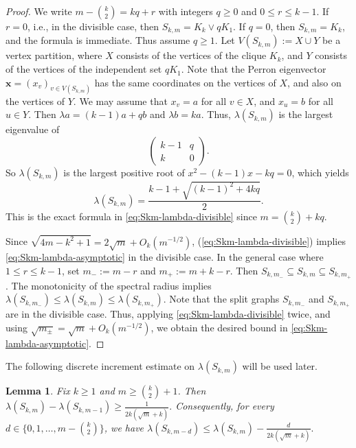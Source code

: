 \documentclass[10pt,a4paper]{amsart}
\newtheorem{lemma}[theorem]{Lemma}
\begin{document}
\begin{proof}
We write $m-\binom{k}{2}=kq+r$ with integers \(q\ge0\) and \(0\le r\le k-1\).
If $r=0$, i.e., in the divisible case, then $S_{k,m}=K_k\vee qK_1$.
If \(q=0\), then \(S_{k,m}=K_k\), and the formula is immediate. Thus assume \(q\ge1\).
Let $V(S_{k,m}):=X\cup Y$ be a vertex partition, where $X$ consists of the vertices of the clique $K_k$, and $Y$ consists of the vertices of the independent set $qK_1$.  
Note that the Perron eigenvector $\bm{x} =(x_v)_{v\in V(S_{k,m})}$ has the same coordinates on the vertices of $X$, and also on the vertices of \(Y\). We may assume that $x_v=a$ for all $v\in X$,  and $x_u=b$ for all $u\in Y$. 
Then $\lambda a=(k-1)a+qb$ and $\lambda b=ka$. Thus, $\lambda (S_{k,m})$ is the largest eigenvalue of 
\[
  \begin{pmatrix}
    k-1 & q \\ k & 0 
  \end{pmatrix}.
\]
So $\lambda(S_{k,m})$ is the largest positive root of $x^2-(k-1)x-kq=0$,
which yields  
\[
  \lambda (S_{k,m})
  =
  \frac{k-1 +\sqrt{(k-1)^2 + 4kq}}{2}.
\]
This is the exact formula in \eqref{eq:Skm-lambda-divisible} since $m=\binom{k}{2}+kq$.

Since $\sqrt{4m-k^2+1}=2\sqrt m+O_k(m^{-1/2})$,  (\ref{eq:Skm-lambda-divisible}) implies \eqref{eq:Skm-lambda-asymptotic} in the divisible case.  
In the general case where $1\le r \le k-1$, set $m_-:=m-r$ and $m_+:=m+k-r$. Then $S_{k,m_-}\subseteq S_{k,m}\subseteq S_{k,m_+}$. 
The monotonicity of the spectral radius implies $\lambda(S_{k,m_-})
   \le
  \lambda(S_{k,m})
   \le
  \lambda(S_{k,m_+}).$
Note that the split graphs $S_{k,m_-}$ and $S_{k,m_+}$ are in the divisible case. Thus, applying \eqref{eq:Skm-lambda-divisible} twice, and using $\sqrt{m_\pm}=\sqrt m+O_k(m^{-1/2})$,  
we obtain the desired bound in \eqref{eq:Skm-lambda-asymptotic}.
\end{proof}

The following discrete increment estimate on $\lambda (S_{k,m})$ will be used later.

\begin{lemma} 
\label{lem:Skm-increment}
Fix $k\ge 1$ and $m\ge \binom{k}{2}+1$.
Then
$\lambda(S_{k,m})-\lambda(S_{k,m-1})
   \ge
  \frac{1}{2k(\sqrt m+k)}.$
Consequently, for every $d\in\{0,1,\dots,m-\binom{k}{2}\}$, we have 
$
  \lambda(S_{k,m-d})
   \le
  \lambda(S_{k,m})-\frac{d}{2k(\sqrt m+k)}.$
\end{lemma}
\end{document}
